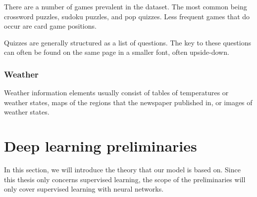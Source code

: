 \documentclass[oneside, english, bibtex]{kththesis}
\begin{document}
There are a number of games prevalent in the dataset. The most common being crossword puzzles, sudoku puzzles, and pop quizzes. Less frequent games that do occur are card game positions.

Quizzes are generally structured as a list of questions. The key to these questions can often be found on the same page in a smaller font, often upside-down.

\subsubsection{Weather}

Weather information elements usually consist of tables of temperatures or weather states, maps of the regions that the newspaper published in, or images of weather states.

\section{Deep learning preliminaries}
\label{sec:preliminaries}

In this section, we will introduce the theory that our model is based on. Since this thesis only concerns supervised learning, the scope of the preliminaries will only cover supervised learning with neural networks.



\end{document}
